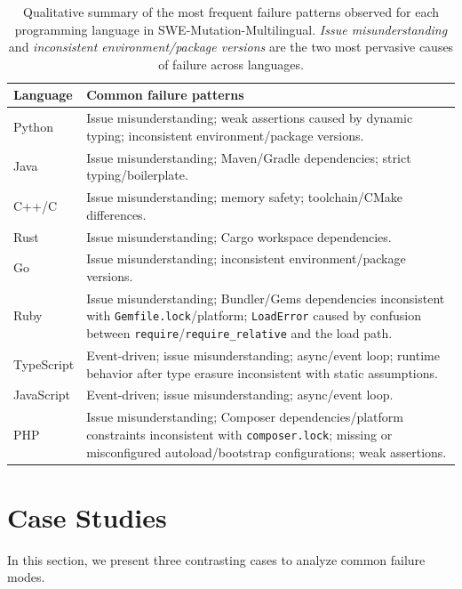 \documentclass[11pt]{article}
\begin{document}
\begin{table}[t]
  \centering
  \small
  \renewcommand{\arraystretch}{1.15}
  \begin{tabularx}{\textwidth}{l X}
    \toprule
    \textbf{Language} & \textbf{Common failure patterns} \\
    \midrule
    Python      & Issue misunderstanding; weak assertions caused by dynamic typing; inconsistent environment/package versions. \\
    Java        & Issue misunderstanding; Maven/Gradle dependencies; strict typing/boilerplate. \\
    C++/C       & Issue misunderstanding; memory safety; toolchain/CMake differences. \\
    Rust        & Issue misunderstanding; Cargo workspace dependencies. \\
    Go          & Issue misunderstanding; inconsistent environment/package versions. \\
    Ruby        & Issue misunderstanding; Bundler/Gems dependencies inconsistent with \texttt{Gemfile.lock}/platform; \texttt{LoadError} caused by confusion between \texttt{require}/\texttt{require\_relative} and the load path. \\
    TypeScript  & Event-driven; issue misunderstanding; async/event loop; runtime behavior after type erasure inconsistent with static assumptions. \\
    JavaScript  & Event-driven; issue misunderstanding; async/event loop. \\
    PHP         & Issue misunderstanding; Composer dependencies/platform constraints inconsistent with \texttt{composer.lock}; missing or misconfigured autoload/bootstrap configurations; weak assertions. \\
    \bottomrule
  \end{tabularx}
  \caption{Qualitative summary of the most frequent failure patterns observed for each programming language in SWE-Mutation-Multilingual. \emph{Issue misunderstanding} and \emph{inconsistent environment/package versions} are the two most pervasive causes of failure across languages.}
  \label{tab:cross_lingual_failures}
\end{table}

\section{Case Studies}
\label{sec:Case Studies}
In this section, we present three contrasting cases to analyze common failure modes.
\end{document}
